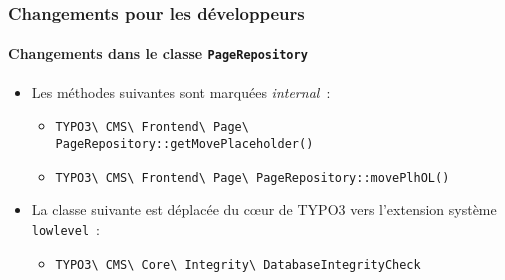 
\begin{frame}[fragile]
	\frametitle{Changements pour les développeurs}
	\framesubtitle{Changements dans le classe \texttt{PageRepository}}

	\begin{itemize}
		\item Les méthodes suivantes sont marquées \textit{internal}~:

			\begin{itemize}
			\smaller
				\item \texttt{TYPO3\textbackslash
					CMS\textbackslash
					Frontend\textbackslash
					Page\textbackslash
					PageRepository::getMovePlaceholder()}

				\item \texttt{TYPO3\textbackslash
					CMS\textbackslash
					Frontend\textbackslash
					Page\textbackslash
					PageRepository::movePlhOL()}
			\end{itemize}

		\item La classe suivante est déplacée du cœur de TYPO3 vers l'extension
			système \texttt{lowlevel}~:

			\begin{itemize}
			\smaller
				\item \texttt{TYPO3\textbackslash
					CMS\textbackslash
					Core\textbackslash
					Integrity\textbackslash
					DatabaseIntegrityCheck}
			\end{itemize}

	\end{itemize}

\end{frame}


